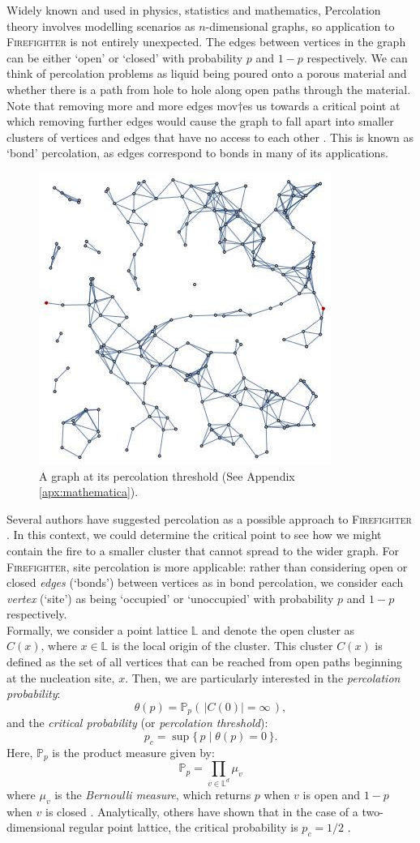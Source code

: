 \documentclass[11pt]{amsart}
\begin{document}
Widely known and used in physics, statistics and mathematics, Percolation theory involves modelling scenarios as $n$-dimensional graphs, so application to {\scshape Firefighter} is not entirely unexpected. The edges between vertices in the graph can be either `open' or `closed' with probability $p$ and $1-p$ respectively. We can think of percolation problems as liquid being poured onto a porous material and whether there is a path from hole to hole along open paths through the material. Note that removing more and more edges mov†es us towards a critical point at which removing further edges would cause the graph to fall apart into smaller clusters of vertices and edges that have no access to each other \cite{grimmett99}. This is known as `bond' percolation, as edges correspond to bonds in many of its applications.\\
\begin{figure}[ht]
	\centering
		\includegraphics[width=0.45\linewidth]{percolated-graph.jpg}
	\caption{A graph at its percolation threshold \cite{mathematica17} (See Appendix \ref{apx:mathematica}).}
	\label{fig:percolated-graph}
\end{figure}
Several authors have suggested percolation as a possible approach to {\scshape Firefighter} \cite{finbow09}. In this context, we could determine the critical point to see how we might contain the fire to a smaller cluster that cannot spread to the wider graph. For {\scshape Firefighter}, site percolation is more applicable: rather than considering open or closed \emph{edges} (`bonds') between vertices as in bond percolation, we consider each \emph{vertex} (`site') as being `occupied' or `unoccupied' with probability $p$ and $1-p$ respectively.\\

Formally, we consider a point lattice $\mathbb{L}$ and denote the open cluster as $C(x)\text{,~where~}x\in\mathbb{L}$ is the local origin of the cluster. This cluster $C(x)$ is defined as the set of all vertices that can be reached from open paths beginning at the nucleation site, $x$. Then, we are particularly interested in the \emph{percolation probability}:
$$
\theta(p) = \mathbb{P}_p(\,|C(0)|=\infty\,),
$$
and the \emph{critical probability} (or \emph{percolation threshold}):
$$
p_c = \sup\{\,p \mid \theta(p)=0\,\}.
$$
Here, $\mathbb{P}_p$ is the product measure given by:
$$
\displaystyle \mathbb{P}_p=\prod_{v\in\mathbb{L}^d}\mu_v
$$
where $\mu_v$ is the \emph{Bernoulli measure}, which returns $p$ when $v$ is open and $1-p$ when $v$ is closed \cite[p. 28]{klenke14}. Analytically, others have shown that in the case of a two-dimensional regular point lattice, the critical probability is $p_c=1/2$ \cite{kersten80}.
\end{document}
